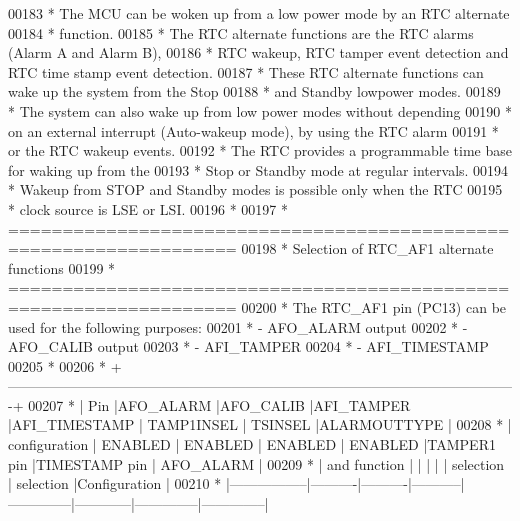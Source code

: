 \begin{DoxyCode}
00183 \textcolor{comment}{  *           The MCU can be woken up from a low power mode by an RTC alternate }
00184 \textcolor{comment}{  *           function.}
00185 \textcolor{comment}{  *           The RTC alternate functions are the RTC alarms (Alarm A and Alarm B), }
00186 \textcolor{comment}{  *           RTC wakeup, RTC tamper event detection and RTC time stamp event detection.}
00187 \textcolor{comment}{  *           These RTC alternate functions can wake up the system from the Stop }
00188 \textcolor{comment}{  *           and Standby lowpower modes.}
00189 \textcolor{comment}{  *           The system can also wake up from low power modes without depending }
00190 \textcolor{comment}{  *           on an external interrupt (Auto-wakeup mode), by using the RTC alarm }
00191 \textcolor{comment}{  *           or the RTC wakeup events.}
00192 \textcolor{comment}{  *           The RTC provides a programmable time base for waking up from the }
00193 \textcolor{comment}{  *           Stop or Standby mode at regular intervals.}
00194 \textcolor{comment}{  *           Wakeup from STOP and Standby modes is possible only when the RTC }
00195 \textcolor{comment}{  *           clock source is LSE or LSI.}
00196 \textcolor{comment}{  *}
00197 \textcolor{comment}{  *          ===================================================================}
00198 \textcolor{comment}{  *                            Selection of RTC\_AF1 alternate functions}
00199 \textcolor{comment}{  *          ===================================================================}
00200 \textcolor{comment}{  *          The RTC\_AF1 pin (PC13) can be used for the following purposes:}
00201 \textcolor{comment}{  *            - AFO\_ALARM output}
00202 \textcolor{comment}{  *            - AFO\_CALIB output}
00203 \textcolor{comment}{  *            - AFI\_TAMPER}
00204 \textcolor{comment}{  *            - AFI\_TIMESTAMP}
00205 \textcolor{comment}{  *}
00206 \textcolor{comment}{  *
       +-------------------------------------------------------------------------------------------------------------+}
00207 \textcolor{comment}{  * |     Pin         |AFO\_ALARM |AFO\_CALIB |AFI\_TAMPER |AFI\_TIMESTAMP | TAMP1INSEL |   TSINSEL   
       |ALARMOUTTYPE  |}
00208 \textcolor{comment}{  * |  configuration  | ENABLED  | ENABLED  |  ENABLED  |   ENABLED    |TAMPER1 pin |TIMESTAMP pin | 
       AFO\_ALARM   |}
00209 \textcolor{comment}{  * |  and function   |          |          |           |              | selection  |  selection  
       |Configuration |}
00210 \textcolor{comment}{  *
       |-----------------|----------|----------|-----------|--------------|------------|--------------|--------------|}

\end{DoxyCode}
